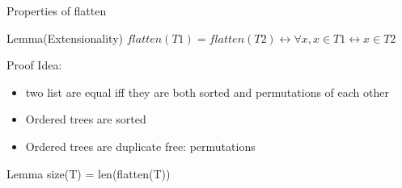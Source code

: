 \documentclass{beamer}
\begin{document}
    \begin{frame}{Properties of flatten}
        \begin{block}{Lemma(Extensionality)}
            $flatten (T1) = flatten (T2) \leftrightarrow \forall x, x \in T1 \leftrightarrow x \in T2$
        \end{block}
        \begin{block}{Proof}
            Idea:
                \begin{itemize}
                    \item two list are equal iff they are both sorted and permutations of each other
                    \item Ordered trees are sorted
                    \item Ordered trees are duplicate free: permutations
                \end{itemize}
        \end{block}
        \begin{block}{Lemma}
            size(T) = len(flatten(T))
        \end{block}
    \end{frame}
\end{document}

